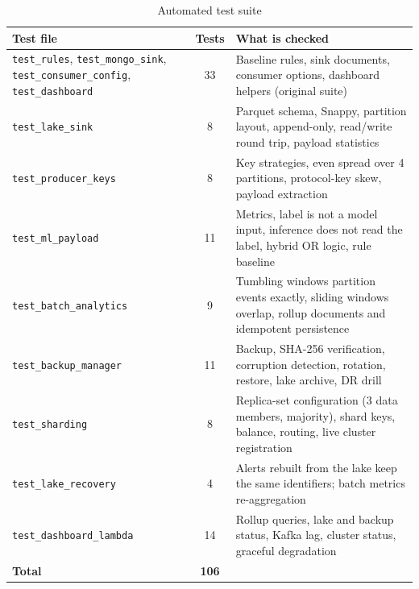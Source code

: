 \begin{table}[H]
\centering
\small
\begin{tabular}{|p{4.6cm}|c|p{7.3cm}|}
\hline
\textbf{Test file} & \textbf{Tests} & \textbf{What is checked} \\ \hline
\texttt{test\_rules}, \texttt{test\_mongo\_sink}, \texttt{test\_consumer\_config}, \texttt{test\_dashboard} & 33 & Baseline rules, sink documents, consumer options, dashboard helpers (original suite) \\ \hline
\texttt{test\_lake\_sink} & 8 & Parquet schema, Snappy, partition layout, append-only, read/write round trip, payload statistics \\ \hline
\texttt{test\_producer\_keys} & 8 & Key strategies, even spread over 4 partitions, protocol-key skew, payload extraction \\ \hline
\texttt{test\_ml\_payload} & 11 & Metrics, label is not a model input, inference does not read the label, hybrid OR logic, rule baseline \\ \hline
\texttt{test\_batch\_analytics} & 9 & Tumbling windows partition events exactly, sliding windows overlap, rollup documents and idempotent persistence \\ \hline
\texttt{test\_backup\_manager} & 11 & Backup, SHA-256 verification, corruption detection, rotation, restore, lake archive, DR drill \\ \hline
\texttt{test\_sharding} & 8 & Replica-set configuration (3 data members, majority), shard keys, balance, routing, live cluster registration \\ \hline
\texttt{test\_lake\_recovery} & 4 & Alerts rebuilt from the lake keep the same identifiers; batch metrics re-aggregation \\ \hline
\texttt{test\_dashboard\_lambda} & 14 & Rollup queries, lake and backup status, Kafka lag, cluster status, graceful degradation \\ \hline
\textbf{Total} & \textbf{106} & \\ \hline
\end{tabular}
\caption{Automated test suite}
\end{table}

